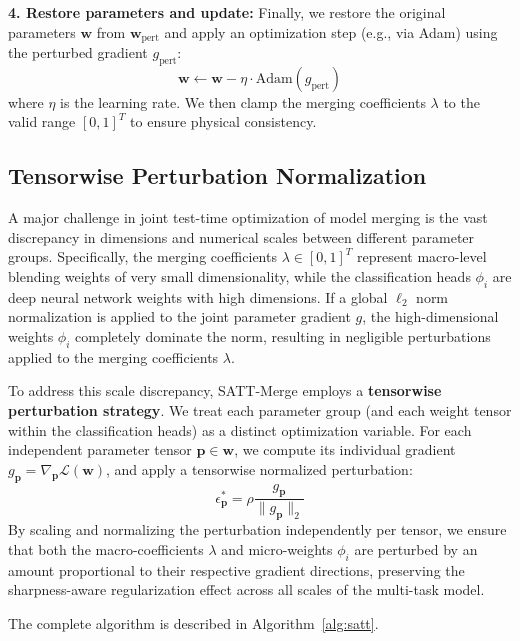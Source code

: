 \documentclass{article}
\begin{document}
\textbf{4. Restore parameters and update:}
Finally, we restore the original parameters $\mathbf{w}$ from $\mathbf{w}_{\text{pert}}$ and apply an optimization step (e.g., via Adam) using the perturbed gradient $g_{\text{pert}}$:
\begin{equation}
    \mathbf{w} \leftarrow \mathbf{w} - \eta \cdot \text{Adam}(g_{\text{pert}})
\end{equation}
where $\eta$ is the learning rate. We then clamp the merging coefficients $\lambda$ to the valid range $[0, 1]^T$ to ensure physical consistency.

\subsection{Tensorwise Perturbation Normalization}
A major challenge in joint test-time optimization of model merging is the vast discrepancy in dimensions and numerical scales between different parameter groups. Specifically, the merging coefficients $\lambda \in [0,1]^T$ represent macro-level blending weights of very small dimensionality, while the classification heads $\phi_i$ are deep neural network weights with high dimensions. If a global $\ell_2$ norm normalization is applied to the joint parameter gradient $g$, the high-dimensional weights $\phi_i$ completely dominate the norm, resulting in negligible perturbations applied to the merging coefficients $\lambda$.

To address this scale discrepancy, SATT-Merge employs a \textbf{tensorwise perturbation strategy}. We treat each parameter group (and each weight tensor within the classification heads) as a distinct optimization variable. For each independent parameter tensor $\mathbf{p} \in \mathbf{w}$, we compute its individual gradient $g_{\mathbf{p}} = \nabla_{\mathbf{p}} \mathcal{L}(\mathbf{w})$, and apply a tensorwise normalized perturbation:
\begin{equation}
    \epsilon_{\mathbf{p}}^* = \rho \frac{g_{\mathbf{p}}}{\|g_{\mathbf{p}}\|_2}
\end{equation}
By scaling and normalizing the perturbation independently per tensor, we ensure that both the macro-coefficients $\lambda$ and micro-weights $\phi_i$ are perturbed by an amount proportional to their respective gradient directions, preserving the sharpness-aware regularization effect across all scales of the multi-task model.

The complete algorithm is described in Algorithm~\ref{alg:satt}.
\end{document}
